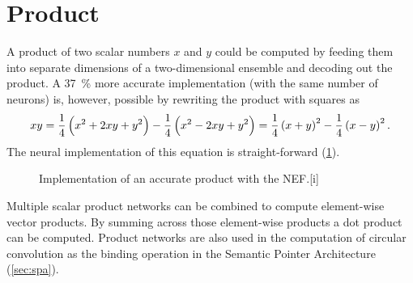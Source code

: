 \section{Product}\label{sec:product}
A product of two scalar numbers $x$ and $y$ could be computed by feeding them into separate dimensions of a two-dimensional ensemble and decoding out the product.
A \SI{37}{\percent} more accurate implementation (with the same number of neurons) is, however, possible \parencite{gosmann2015-1} by rewriting the product with squares as
\begin{equation}
    xy = \frac{1}{4}\del{x^2 + 2xy + y^2} - \frac{1}{4}\del{x^2 - 2xy + y^2} = \frac{1}{4}\del{x + y}^2 - \frac{1}{4}\del{x - y}^2 \text{.}
\end{equation}
The neural implementation of this equation is straight-forward (\cref{fig:product-net}).
\begin{figure}
    \begin{captionbeside}{Implementation of an accurate product with the NEF.}[i]
    \end{captionbeside}\label{fig:product-net}
\end{figure}

Multiple scalar product networks can be combined to compute element-wise vector products.
By summing across those element-wise products a dot product can be computed.
Product networks are also used in the computation of circular convolution as the binding operation in the Semantic Pointer Architecture (\cref{sec:spa}).
